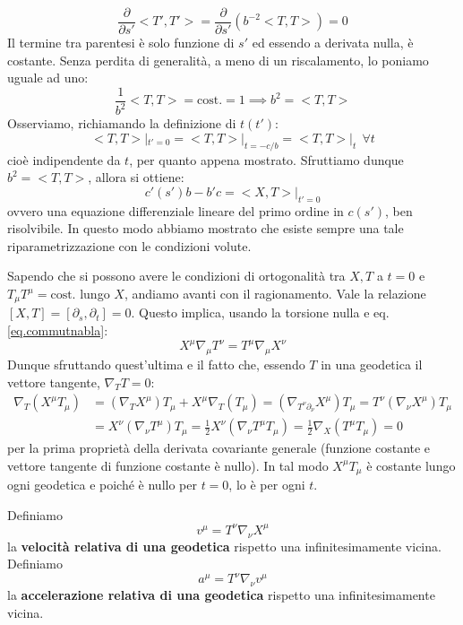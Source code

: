 \begin{equation*}
    \frac{\partial}{\partial s'} <T', T'> = \frac{\partial}{\partial s'} (b^{-2} <T,T> ) = 0
\end{equation*}
Il termine tra parentesi è solo funzione di $s'$ ed essendo a derivata nulla, è costante. Senza perdita di generalità, a meno di un riscalamento, lo poniamo uguale ad uno:
\begin{equation*}
    \frac{1}{b^2}<T,T> = \textrm{cost.} = 1 \implies b^2= <T,T>
\end{equation*}
Osserviamo, richiamando la definizione di $t(t')$:
\begin{equation*}
    <T, T>|_{t'=0} =    <T, T>|_{t=-c/b} =    <T, T>|_{t} \ \ \forall t
\end{equation*}
cioè indipendente da $t$, per quanto appena mostrato. Sfruttiamo dunque $ b^2= <T,T>$, allora si ottiene:
\begin{equation*}
    c'(s')b - b'c = <X, T>|_{t'=0}
\end{equation*}
ovvero una equazione differenziale lineare del primo ordine in $c(s')$, ben risolvibile. In questo modo abbiamo mostrato che esiste sempre una tale riparametrizzazione con le condizioni volute.

Sapendo che si possono avere le condizioni di ortogonalità tra $X, T$ a $t=0$ e $T_\mu T^\mu = \textrm{cost.}$ lungo $X$, andiamo avanti con il ragionamento. Vale la relazione $[X,T]=[\partial_s, \partial_t]=0$. Questo implica, usando la torsione nulla e eq. \ref{eq.commutnabla}:
\begin{equation}
    X^\mu\nabla_\mu T^\nu = T^\mu\nabla_\mu X^\nu \label{eq.formuuladerivgeod}
\end{equation}
Dunque sfruttando quest'ultima e il fatto che, essendo $T$ in una geodetica il vettore tangente, $\nabla_T T=0$:
\begin{align*}
    \nabla_T(X^\mu T_\mu) &=  (\nabla_T X^\mu)T_\mu +  X^\mu\nabla_T(T_\mu) =  (\nabla_{T^\nu{\partial_\nu}} X^\mu)T_\mu = T^\nu (\nabla_\nu X^\mu) T_\mu \\
    &= X^\nu(\nabla_\nu T^\mu) T_\mu = \frac{1}{2} X^\nu(\nabla_\nu T^\mu T_\mu) = \frac{1}{2} \nabla_X( T^\mu T_\mu) = 0
\end{align*}
per la prima proprietà della derivata covariante generale (funzione costante e vettore tangente di funzione costante è nullo). In tal modo $X^\mu T_\mu$ è costante lungo ogni geodetica e poiché è nullo per $t=0$, lo è per ogni $t$.
\begin{definizione}
Definiamo
\begin{equation*}
    v^\mu = T^\nu \nabla_\nu X^\mu 
\end{equation*}
la \textbf{velocità relativa di una geodetica} rispetto una infinitesimamente vicina.
Definiamo
\begin{equation*}
    a^\mu = T^\nu \nabla_\nu v^\mu
\end{equation*}
la \textbf{accelerazione relativa di una geodetica} rispetto una infinitesimamente vicina.
\end{definizione}

